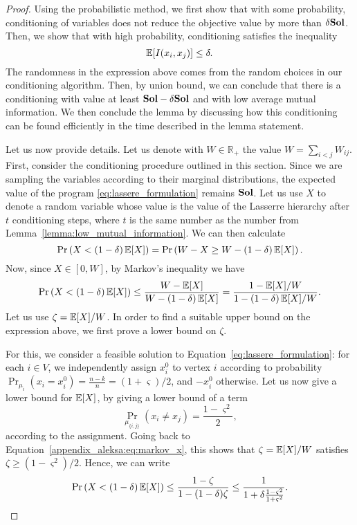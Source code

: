 \begin{proof}
	Using the probabilistic method, we first show that with some probability, conditioning of variables does not reduce the 
	objective value by more than $\delta \mathbf{Sol}$. Then, we show that with high probability, conditioning satisfies the inequality 
	\begin{equation*}
		\operatorname*{\mathbb{E}}[I(x_i, x_j)] \leq \delta.
	\end{equation*}
	The randomness in the expression above comes from the random choices in our conditioning algorithm. 
	Then, by union bound, we can conclude that there is a conditioning with value at least $\mathbf{Sol} - \delta \mathbf{Sol}$ and with low average mutual information. We then conclude the lemma by discussing how this conditioning can be found efficiently in the time described in the lemma statement.

	Let us now provide details. Let us denote with $W \in \mathbb{R}_+$ the
	value $W=\sum_{i<j} W_{ij}$. First, consider the conditioning procedure
	outlined in this section. Since we are sampling the variables according to
	their marginal distributions, the expected value of the program
	\eqref{eq:lassere_formulation} remains $\mathbf{Sol}$. Let us use $X$  to denote a
	random variable whose value is the value of the Lasserre hierarchy after $t$
	conditioning steps, where $t$ is the same number as the number from Lemma~\ref{lemma:low_mutual_information}. We can then calculate
	\begin{equation*}
		\Pr\left( X < (1-\delta) \operatorname*{\mathbb{E}}[X] \right) = \Pr\left(W-X \geq  W- (1-\delta) \operatorname*{\mathbb{E}}[X] \right).  
		\end{equation*}
	Now, since $X \in [0,W]$, by Markov's inequality we have 
	\begin{equation}\label{appendix_aleksa:eq:markov_x}
		\Pr\left( X < (1-\delta) \operatorname*{\mathbb{E}}[X] \right) \leq \frac{W- \operatorname*{\mathbb{E}}[X]}{W-(1-\delta) \operatorname*{\mathbb{E}}[X]}  = \frac{1- \operatorname*{\mathbb{E}}[X]/W}{1-(1-\delta)\operatorname*{\mathbb{E}}[X]/W}.
	\end{equation}
	Let us use $\zeta=\operatorname*{\mathbb{E}}[X]/W$. In order to find a suitable upper bound on the expression above, we first prove a lower bound 
	on $\zeta$. 
	

	For this, we consider a feasible solution to 
 Equation~\eqref{eq:lassere_formulation}: for each 
	$i \in V$, we independently assign $x_i^0$  to vertex $i$  according to probability $\Pr_{\mu_{i}}(x_i = x_i^0)= \frac{n-k}{n} =(1+\varsigma)/2$, 
	and $-x_i^0$ otherwise. 
 Let us now give a lower bound for $\operatorname*{\mathbb{E}}[X]$,  by giving a lower bound of a term 
	\begin{equation*}
		\Pr_{\mu_{\{i,j\}}} (x_i \neq x_j) = \frac{1-\varsigma^2}{2},
	\end{equation*}
	according to the assignment.
	Going back to Equation~\eqref{appendix_aleksa:eq:markov_x}, this shows that $\zeta=\operatorname*{\mathbb{E}}[X]/W$  satisfies $\zeta \geq (1-\varsigma^2)/2$.
	Hence, we can write
	\begin{equation*}
		\Pr\left( X < (1-\delta) \operatorname*{\mathbb{E}}[X] \right) \leq \frac{1- \zeta}{1-(1-\delta)\zeta}  
		\leq \frac{1}{1+\delta\frac{1-\varsigma^{2}}{1+\varsigma^{2}}}.
	\end{equation*}
 

\end{proof}
